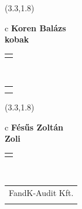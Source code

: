 \documentclass[11pt]{article}
\begin{document}
\makebox(3.3,1.8){
  \renewcommand\arraystretch{1.3}
  \begin{tabular}[c]{c}
    \hspace{8.5mm}
    \LARGE\bf{ Koren Balázs }\\
    \hspace{8.5mm}
    \Large{ kobak }\\
    \renewcommand\arraystretch{3}
    \begin{tabular}[c]{c}
      \centering
      \fontfamily{phv}\selectfont{
        \textbf{
          \textsc{
            \scriptsize{
            \color{Bright}{ Ismerkedő }\color{Dark}{ Webmester }\color{Dark}{ Sminkmester }\color{Bright}{ Programozó }
            }
          }
        }
      }
    \end{tabular}
    \\
    \renewcommand\arraystretch{1}
    \begin{tabular}{p{3.3in}}
      \hspace{.7cm}\\
      \hspace{.7cm}\emph{  }\\
    \end{tabular}
  \end{tabular}
}

\makebox(3.3,1.8){
  \renewcommand\arraystretch{1.3}
  \begin{tabular}[c]{c}
    \hspace{8.5mm}
    \LARGE\bf{ Fésűs Zoltán }\\
    \hspace{8.5mm}
    \Large{ Zoli }\\
    \renewcommand\arraystretch{3}
    \begin{tabular}[c]{c}
      \centering
      \fontfamily{phv}\selectfont{
        \textbf{
          \textsc{
            \scriptsize{
            \color{Dark}{ Ismerkedő }\color{Bright}{ Webmester }\color{Bright}{ Sminkmester }\color{Bright}{ Programozó }
            }
          }
        }
      }
    \end{tabular}
    \\
    \renewcommand\arraystretch{1}
    \begin{tabular}{p{3.3in}}
      \hspace{.7cm}FandK-Audit Kft.\\
      \hspace{.7cm}\emph{  }\\
    \end{tabular}
  \end{tabular}
}
\end{document}
